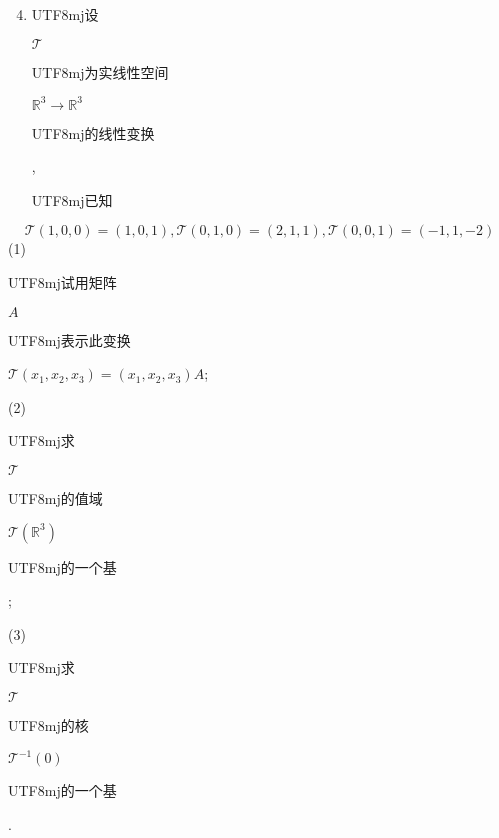 \documentclass[10pt]{article}
\begin{document}
\begin{enumerate}
  \setcounter{enumi}{3}
  \item \begin{CJK}{UTF8}{mj}设\end{CJK} $\mathscr{T}$ \begin{CJK}{UTF8}{mj}为实线性空间\end{CJK} $\mathbb{R}^{3} \rightarrow \mathbb{R}^{3}$ \begin{CJK}{UTF8}{mj}的线性变换\end{CJK}, \begin{CJK}{UTF8}{mj}已知\end{CJK}
\end{enumerate}
$$
\mathscr{T}(1,0,0)=(1,0,1), \mathscr{T}(0,1,0)=(2,1,1), \mathscr{T}(0,0,1)=(-1,1,-2)
$$
(1) \begin{CJK}{UTF8}{mj}试用矩阵\end{CJK} $A$ \begin{CJK}{UTF8}{mj}表示此变换\end{CJK} $\mathscr{T}\left(x_{1}, x_{2}, x_{3}\right)=\left(x_{1}, x_{2}, x_{3}\right) A$;

(2) \begin{CJK}{UTF8}{mj}求\end{CJK} $\mathscr{T}$ \begin{CJK}{UTF8}{mj}的值域\end{CJK} $\mathscr{T}\left(\mathbb{R}^{3}\right)$ \begin{CJK}{UTF8}{mj}的一个基\end{CJK};

(3) \begin{CJK}{UTF8}{mj}求\end{CJK} $\mathscr{T}$ \begin{CJK}{UTF8}{mj}的核\end{CJK} $\mathscr{T}^{-1}(0)$ \begin{CJK}{UTF8}{mj}的一个基\end{CJK}.
\end{document}
